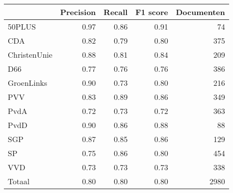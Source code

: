 \begin{tabular}{lrrrr}
\toprule
{} &  Precision &  Recall &  F1 score &  Documenten \\
\midrule
50PLUS       &       0.97 &    0.86 &      0.91 &          74 \\
CDA          &       0.82 &    0.79 &      0.80 &         375 \\
ChristenUnie &       0.88 &    0.81 &      0.84 &         209 \\
D66          &       0.77 &    0.76 &      0.76 &         386 \\
GroenLinks   &       0.90 &    0.73 &      0.80 &         216 \\
PVV          &       0.83 &    0.89 &      0.86 &         349 \\
PvdA         &       0.72 &    0.73 &      0.72 &         363 \\
PvdD         &       0.90 &    0.86 &      0.88 &          88 \\
SGP          &       0.87 &    0.85 &      0.86 &         129 \\
SP           &       0.75 &    0.86 &      0.80 &         454 \\
VVD          &       0.73 &    0.73 &      0.73 &         338 \\
Totaal       &       0.80 &    0.80 &      0.80 &        2980 \\
\bottomrule
\end{tabular}

